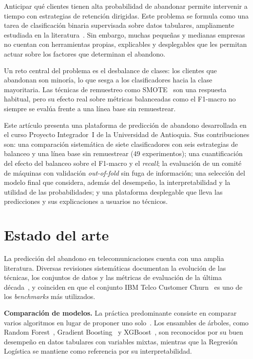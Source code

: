 \documentclass[conference]{IEEEtran}
\begin{document}
Anticipar qué clientes tienen alta probabilidad de abandonar permite intervenir a tiempo con estrategias de retención dirigidas. Este problema se formula como una tarea de clasificación binaria supervisada sobre datos tabulares, ampliamente estudiada en la literatura~\cite{lalwani2020review,survey2024decade,review2026systematic}. Sin embargo, muchas pequeñas y medianas empresas no cuentan con herramientas propias, explicables y desplegables que les permitan actuar sobre los factores que determinan el abandono.

Un reto central del problema es el desbalance de clases: los clientes que abandonan son minoría, lo que sesga a los clasificadores hacia la clase mayoritaria. Las técnicas de remuestreo como SMOTE~\cite{chawla2002smote} son una respuesta habitual, pero su efecto real sobre métricas balanceadas como el F1-macro no siempre se evalúa frente a una línea base sin remuestrear.

Este artículo presenta una plataforma de predicción de abandono desarrollada en el curso Proyecto Integrador~I de la Universidad de Antioquia. Sus contribuciones son: una comparación sistemática de siete clasificadores con seis estrategias de balanceo y una línea base sin remuestrear (49 experimentos); una cuantificación del efecto del balanceo sobre el F1-macro y el \emph{recall}; la evaluación de un comité de máquinas con validación \emph{out-of-fold} sin fuga de información; una selección del modelo final que considera, además del desempeño, la interpretabilidad y la utilidad de las probabilidades; y una plataforma desplegable que lleva las predicciones y sus explicaciones a usuarios no técnicos.

\section{Estado del arte}\label{sec:estado}

La predicción del abandono en telecomunicaciones cuenta con una amplia literatura. Diversas revisiones sistemáticas documentan la evolución de las técnicas, los conjuntos de datos y las métricas de evaluación de la última década~\cite{lalwani2020review,survey2024decade,review2026systematic}, y coinciden en que el conjunto IBM Telco Customer Churn~\cite{ibmtelco} es uno de los \emph{benchmarks} más utilizados.

\textbf{Comparación de modelos.} La práctica predominante consiste en comparar varios algoritmos en lugar de proponer uno solo~\cite{hindawi2022detecting,plos2023retention,plos2025predictive,imitec2024ml}. Los ensambles de árboles, como Random Forest~\cite{breiman2001rf}, Gradient Boosting~\cite{friedman2001gbm} y XGBoost~\cite{chen2016xgboost}, son reconocidos por su buen desempeño en datos tabulares con variables mixtas, mientras que la Regresión Logística se mantiene como referencia por su interpretabilidad.
\end{document}

